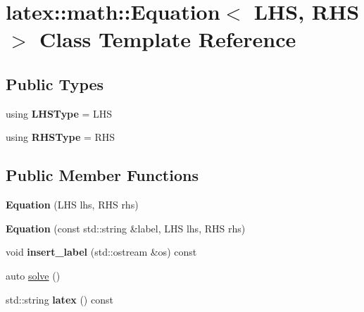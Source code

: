 \hypertarget{classlatex_1_1math_1_1Equation}{\section{latex\-:\-:math\-:\-:Equation$<$ L\-H\-S, R\-H\-S $>$ Class Template Reference}
\label{classlatex_1_1math_1_1Equation}
}
\subsection*{Public Types}
\begin{DoxyCompactItemize}
\item 
\hypertarget{classlatex_1_1math_1_1Equation_aa9edc347823879f6651a4b3dbe31060f}{using {\bfseries L\-H\-S\-Type} = L\-H\-S}\label{classlatex_1_1math_1_1Equation_aa9edc347823879f6651a4b3dbe31060f}

\item 
\hypertarget{classlatex_1_1math_1_1Equation_a70e604aaab38b87af4df46932fab25cc}{using {\bfseries R\-H\-S\-Type} = R\-H\-S}\label{classlatex_1_1math_1_1Equation_a70e604aaab38b87af4df46932fab25cc}

\end{DoxyCompactItemize}
\subsection*{Public Member Functions}
\begin{DoxyCompactItemize}
\item 
\hypertarget{classlatex_1_1math_1_1Equation_abf2df112f6302c99b56fa31927142d33}{{\bfseries Equation} (L\-H\-S lhs, R\-H\-S rhs)}\label{classlatex_1_1math_1_1Equation_abf2df112f6302c99b56fa31927142d33}

\item 
\hypertarget{classlatex_1_1math_1_1Equation_a354a3d509dd259c1c0b51ab915867169}{{\bfseries Equation} (const std\-::string \&label, L\-H\-S lhs, R\-H\-S rhs)}\label{classlatex_1_1math_1_1Equation_a354a3d509dd259c1c0b51ab915867169}

\item 
\hypertarget{classlatex_1_1math_1_1Equation_a8c74a11c75dee6f3ab7f92a322942704}{void {\bfseries insert\-\_\-label} (std\-::ostream \&os) const }\label{classlatex_1_1math_1_1Equation_a8c74a11c75dee6f3ab7f92a322942704}

\item 
auto \hyperlink{classlatex_1_1math_1_1Equation_a07edd6119b4c578f0bd109501284120b}{solve} ()
\item 
\hypertarget{classlatex_1_1math_1_1Equation_acc052b3d3d93f32438ada7338b641d6e}{std\-::string {\bfseries latex} () const }\label{classlatex_1_1math_1_1Equation_acc052b3d3d93f32438ada7338b641d6e}

\end{DoxyCompactItemize}
